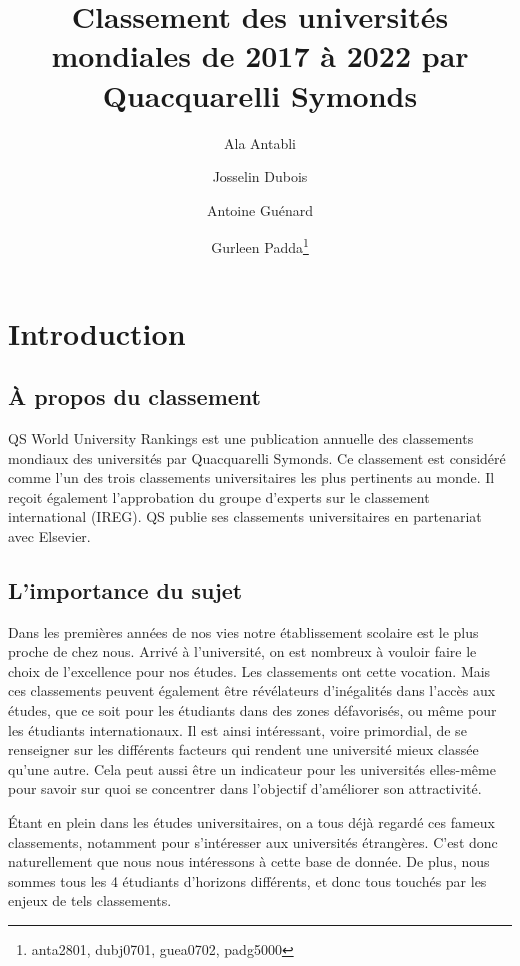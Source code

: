 \documentclass[twocolumns]{udes_rapport}
\begin{document}
\title{
    Classement des universités mondiales de 2017 à 2022 par Quacquarelli Symonds
}
\author{
    Ala Antabli\and Josselin Dubois\and Antoine Guénard\and Gurleen Padda\footnote{anta2801, dubj0701, guea0702, padg5000}
}

\maketitle

\section{Introduction}\label{sec:introduction}

    \subsection{À propos du classement}\label{subsec:ranking}

        QS World University Rankings est une publication annuelle des classements mondiaux des universités par Quacquarelli Symonds. Ce classement est considéré comme l'un des trois classements universitaires les plus pertinents au monde. Il reçoit également l'approbation du groupe d'experts sur le classement international (IREG). QS publie ses classements universitaires en partenariat avec Elsevier.

    \subsection{L'importance du sujet}\label{subsec:subject_importance}
    
        Dans les premières années de nos vies notre établissement scolaire est le plus proche de chez nous. Arrivé à l'université, on est nombreux à vouloir faire le choix de l'excellence pour nos études. Les classements ont cette vocation. Mais ces classements peuvent également être révélateurs d'inégalités dans l'accès aux études, que ce soit pour les étudiants dans des zones défavorisés, ou même pour les étudiants internationaux. Il est ainsi intéressant, voire primordial, de se renseigner sur les différents facteurs qui rendent une université mieux classée qu'une autre. Cela peut aussi être un indicateur pour les universités elles-même pour savoir sur quoi se concentrer dans l'objectif d'améliorer son attractivité.
        
        Étant en plein dans les études universitaires, on a tous déjà regardé ces fameux classements, notamment pour s'intéresser aux universités étrangères. C'est donc naturellement que nous nous intéressons à cette base de donnée.
        De plus, nous sommes tous les 4 étudiants d'horizons différents, et donc tous touchés par les enjeux de tels classements.
\end{document}
